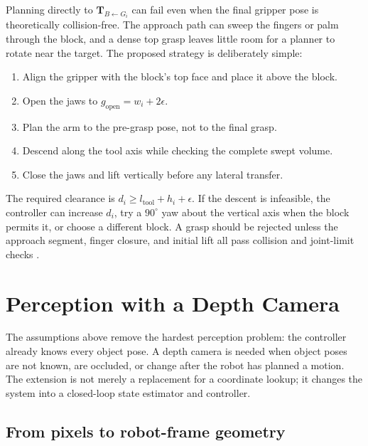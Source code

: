 \documentclass{article}
\begin{document}
Planning directly to $\mathbf{T}_{B\leftarrow G_i}$ can fail even when the
final gripper pose is theoretically collision-free. The approach path can sweep
the fingers or palm through the block, and a dense top grasp leaves little room
for a planner to rotate near the target. The proposed strategy is deliberately
simple:
\begin{enumerate}[leftmargin=1.3em,itemsep=2pt,topsep=2pt]
  \item Align the gripper with the block's top face and place it above the block.
  \item Open the jaws to $g_{\mathrm{open}}=w_i+2\epsilon$.
  \item Plan the arm to the pre-grasp pose, not to the final grasp.
  \item Descend along the tool axis while checking the complete swept volume.
  \item Close the jaws and lift vertically before any lateral transfer.
\end{enumerate}
The required clearance is
$d_i\geq l_{\mathrm{tool}}+h_i+\epsilon$. If the descent is infeasible, the
controller can increase $d_i$, try a $90^\circ$ yaw about the vertical axis when
the block permits it, or choose a different block. A grasp should be rejected
unless the approach segment, finger closure, and initial lift all pass collision
and joint-limit checks \citep{coleman2014moveit,sundaresan2023curobo}.

\section{Perception with a Depth Camera}\label{sec:perception}

The assumptions above remove the hardest perception problem: the controller
already knows every object pose. A depth camera is needed when object poses are
not known, are occluded, or change after the robot has planned a motion. The
extension is not merely a replacement for a coordinate lookup; it changes the
system into a closed-loop state estimator and controller.

\subsection{From pixels to robot-frame geometry}
\end{document}
